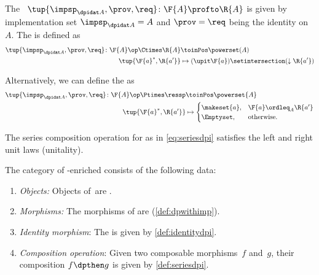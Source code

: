\begin{definition}
    \label{def:identitydpi}
    The ~$\tup{\impsp_{\dpidat A},\prov,\req} \colon \F{A} \profto \R{A}$ is given by implementation set $\impsp_{\dpidat A} = A$ and $\prov=\req$ being the identity on $A$.
    The  is defined as
    \begin{align}
        \tup{\impsp_{\dpidat A},\prov,\req} \colon \F{A}\op \Ctimes \R{A} & \toinPos \powerset(A) \\
        \tup{\F{a}^*,\R{a'}}                                              & \mapsto (\upit \F{a}) \setintersection (\downarrow \R{a'})
    \end{align}
\end{definition}
\begin{remark}
    Alternatively, we can define the  as
    \begin{align}
        \tup{\impsp_{\dpidat A},\prov,\req}\colon \F{A}\op \Ptimes \ressp & \toinPos \powerset{A} \\
        \tup{\F{a}^*,\R{a'}}                                              & \mapsto
        \begin{cases}
            \makeset{a}, & \F{a}\ordleq_A \R{a'} \\
            \Emptyset,   & \text{otherwise}.
        \end{cases}
    \end{align}
\end{remark}

\begin{lemma}
    \label{lem:dp-unital}
    The series composition operation for  as in \cref{eq:seriesdpi} satisfies the left and right unit laws (unitality).
\end{lemma}


\begin{definition}
    \label{def:set-enriched-dp}
    The category of \Set-enriched  \DPI consists of the following data:
    \begin{enumerate}
        \item \emph{Objects:}
              Objects of~\DPI are .
        \item \emph{Morphisms:}
              The morphisms of \DPI are  (\cref{def:dpwithimp}).
        \item \emph{Identity morphism}: The  is given by \cref{def:identitydpi}.
        \item \emph{Composition operation}: Given two composable morphisms~$f$ and~$g$, their composition $f\dpthen g$ is given by \cref{def:seriesdpi}.
    \end{enumerate}
\end{definition}

